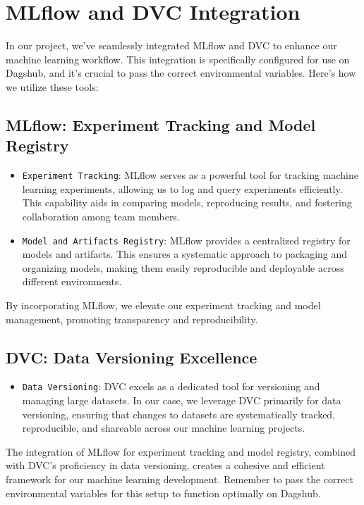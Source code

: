 \documentclass{report}
\begin{document}
\chapter{MLflow and DVC Integration}\label{chap:mlflow-dvc-integration}

In our project, we've seamlessly integrated MLflow and DVC to enhance our machine learning workflow. This integration is specifically configured for use on Dagshub, and it's crucial to pass the correct environmental variables. Here's how we utilize these tools:

\section{MLflow: Experiment Tracking and Model Registry}

\begin{itemize}
    \item \texttt{Experiment Tracking}: MLflow serves as a powerful tool for tracking machine learning experiments, allowing us to log and query experiments efficiently. This capability aids in comparing models, reproducing results, and fostering collaboration among team members.
    \item \texttt{Model and Artifacts Registry}: MLflow provides a centralized registry for models and artifacts. This ensures a systematic approach to packaging and organizing models, making them easily reproducible and deployable across different environments.
\end{itemize}

By incorporating MLflow, we elevate our experiment tracking and model management, promoting transparency and reproducibility.

\section{DVC: Data Versioning Excellence}

\begin{itemize}
    \item \texttt{Data Versioning}: DVC excels as a dedicated tool for versioning and managing large datasets. In our case, we leverage DVC primarily for data versioning, ensuring that changes to datasets are systematically tracked, reproducible, and shareable across our machine learning projects.
\end{itemize}

The integration of MLflow for experiment tracking and model registry, combined with DVC's proficiency in data versioning, creates a cohesive and efficient framework for our machine learning development. Remember to pass the correct environmental variables for this setup to function optimally on Dagshub.
\end{document}
